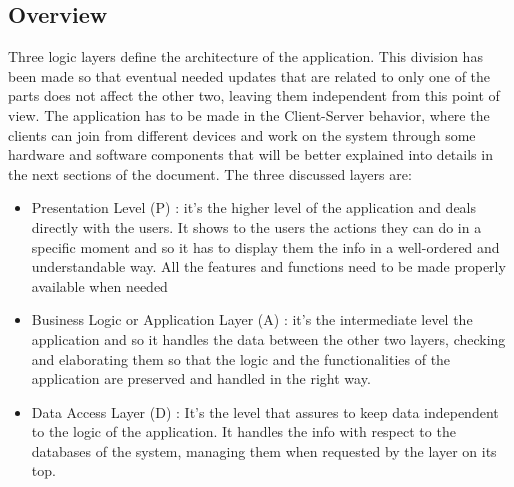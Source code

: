 \documentclass[]{article}
\begin{document}
			\subsection{Overview}
				\begin{paragraph}
					\newline
					Three logic layers define the architecture of the application. This division has been made so that eventual needed updates that are related to only one of the parts does not affect the other two, leaving them independent from this point of view. The application has to be made in the Client-Server behavior, where the clients can join from different devices and work on the system through some hardware and software components that will be better explained into details in the next sections of the document. The three discussed layers are:\\
					\begin{itemize}
						\item Presentation Level (P) : it’s the higher level of the application and deals directly with the users. It shows to the users the actions they can do in a specific moment and so it has to display them the info in a well-ordered and understandable way. All the features and functions need to be made properly available when needed\\
						\item Business Logic or Application Layer (A) :  it’s the intermediate level the application and so it handles the data between the other two layers, checking and elaborating them so that the logic and the functionalities of the application are preserved and handled in the right way.\\
						\item Data Access Layer (D) : It’s the level that assures to keep data independent to the logic of the application. It handles the info with respect to the databases of the system, managing them when requested by the layer on its top.\\ \newline
					\end{itemize}
					

\end{paragraph}
\end{document}
